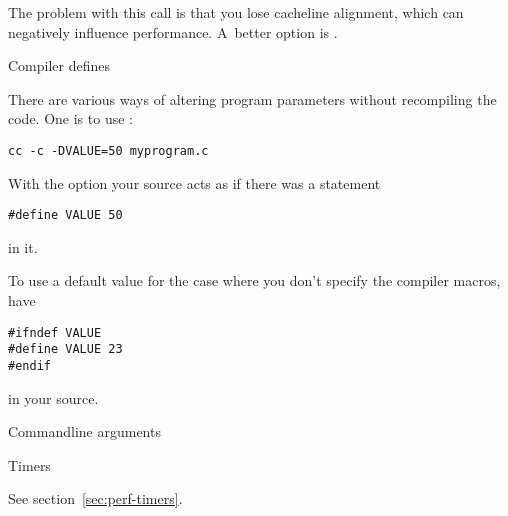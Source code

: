 The problem with this call is that you lose cacheline alignment, which
can negatively influence performance. A~better option is
.

 {Compiler defines}

There are various ways of altering program parameters without
recompiling the code. One is to use :
\begin{verbatim}
cc -c -DVALUE=50 myprogram.c
\end{verbatim}
With the  option your source acts as if there was a statement
\begin{verbatim}
#define VALUE 50
\end{verbatim}
in it.

To use a default value for the case where you don't specify the
compiler macros, have
\begin{verbatim}
#ifndef VALUE
#define VALUE 23
#endif
\end{verbatim}
in your source.

 {Commandline arguments}

 {Timers}

See section~\ref{sec:perf-timers}.

